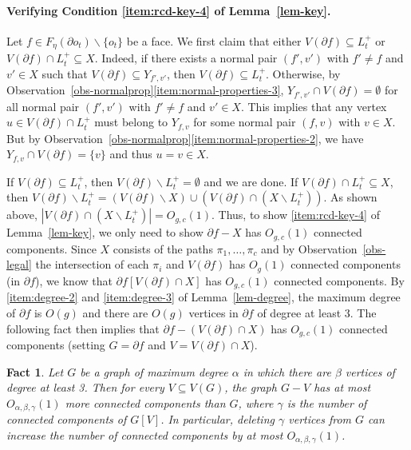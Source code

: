 \documentclass[a4paper,11pt]{article}
\numberwithin{lemma}{section}
\newtheorem{fact}[lemma]{Fact}
\begin{document}
\paragraph{Verifying Condition \ref{item:rcd-key-4} of Lemma~\ref{lem-key}.}
Let $f \in F_\eta(\partial o_t) \backslash \{o_t\}$ be a face.
We first claim that either $V(\partial f) \subseteq L_t^+$ or $V(\partial f) \cap L_t^+ \subseteq X$.
Indeed, if there exists a normal pair $(f',v')$ with $f' \neq f$ and $v' \in X$ such that $V(\partial f) \subseteq Y_{f',v'}$, then $V(\partial f) \subseteq L_t^+$.
Otherwise, by Observation~\ref{obs-normalprop}\ref{item:normal-properties-3}, $Y_{f',v'} \cap V(\partial f) = \emptyset$ for all normal pair $(f',v')$ with $f' \neq f$ and $v' \in X$.
This implies that any vertex $u \in V(\partial f) \cap L_t^+$ must belong to $Y_{f,v}$ for some normal pair $(f,v)$ with $v \in X$.
But by Observation~\ref{obs-normalprop}\ref{item:normal-properties-2}, we have $Y_{f,v} \cap V(\partial f) = \{v\}$ and thus $u = v \in X$.

If $V(\partial f) \subseteq L_t^+$, then $V(\partial f) \backslash L_t^+ = \emptyset$ and we are done.
If $V(\partial f) \cap L_t^+ \subseteq X$, then $V(\partial f) \backslash L_t^+ = (V(\partial f) \backslash X) \cup (V(\partial f) \cap (X \backslash L_t^+))$.
As shown above, $|V(\partial f) \cap (X \backslash L_t^+)| = O_{g,c}(1)$.
Thus, to show \ref{item:rcd-key-4} of Lemma~\ref{lem-key}, we only need to show $\partial f - X$ has $O_{g,c}(1)$ connected components.
Since $X$ consists of the paths $\pi_1,\dots,\pi_c$ and by Observation~\ref{obs-legal} the intersection of each $\pi_i$ and $V(\partial f)$ has $O_g(1)$ connected components (in $\partial f$), we know that $\partial f[V(\partial f) \cap X]$ has $O_{g,c}(1)$ connected components.
By \ref{item:degree-2} and \ref{item:degree-3} of Lemma~\ref{lem-degree}, the maximum degree of $\partial f$ is $O(g)$ and there are $O(g)$ vertices in $\partial f$ of degree at least 3.
The following fact then implies that $\partial f - (V(\partial f) \cap X)$ has $O_{g,c}(1)$ connected components (setting $G = \partial f$ and $V = V(\partial f) \cap X$).

\begin{fact}\label{fact-components}
Let $G$ be a graph of maximum degree $\alpha$ in which there are $\beta$ vertices of degree at least 3.
Then for every $V \subseteq V(G)$, the graph $G-V$ has at most $O_{\alpha,\beta,\gamma}(1)$ more connected components than $G$, where $\gamma$ is the number of connected components of $G[V]$.
In particular, deleting $\gamma$ vertices from $G$ can increase the number of connected components by at most $O_{\alpha,\beta,\gamma}(1)$.
\end{fact}
\end{document}
